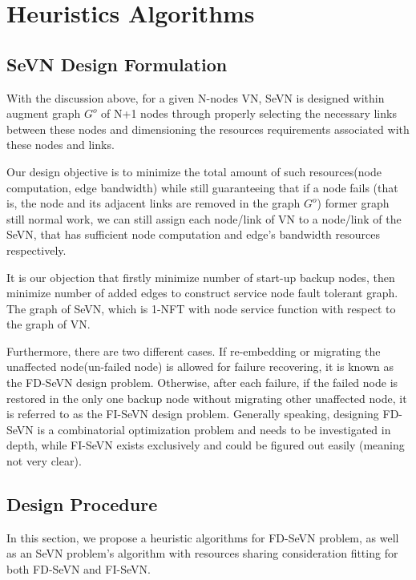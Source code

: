 \section{Heuristics Algorithms}



\subsection{SeVN Design Formulation}
With the discussion above, for a given N-nodes VN, SeVN is designed within augment graph $G^o$ of N+1 nodes through properly selecting the necessary links between these nodes and dimensioning the resources requirements associated with these nodes and links.

Our design objective is to minimize the total amount of such resources(node computation, edge bandwidth) while still guaranteeing that if a node fails (that is, the node and its adjacent links are removed in the graph $G^o$) former graph still normal work, we can still assign each node/link of VN to a node/link of the SeVN, that has sufficient node computation and edge's bandwidth resources respectively.

It is our objection that firstly minimize number of start-up backup nodes, then minimize number of added edges to construct service node fault tolerant graph. The graph of SeVN, which is 1-NFT with node service function with respect to the graph of VN.


Furthermore, there are two different cases. If re-embedding or migrating the unaffected node(un-failed node) is allowed for failure recovering, it is known as the FD-SeVN design problem. Otherwise, after each failure, if the failed node is restored in the only one backup node without migrating other unaffected node, it is referred to as the FI-SeVN design problem. Generally speaking, designing FD-SeVN is a combinatorial optimization problem and needs to be investigated in depth, while FI-SeVN exists exclusively and could be figured out easily (meaning not very clear).


\subsection{Design Procedure}

In this section, we propose a heuristic algorithms for FD-SeVN problem, as well as an SeVN problem's algorithm with resources sharing consideration fitting for both FD-SeVN and FI-SeVN.

